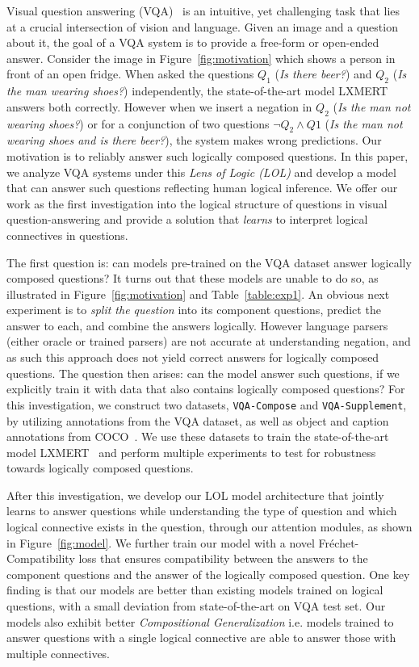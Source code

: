 Visual question answering (VQA)~\citep{antol2015vqa} is an intuitive, yet challenging task that lies at a crucial intersection of vision and language. 
Given an image and a question about it, the goal of a VQA system is to provide a free-form or open-ended answer.
Consider the image in Figure~\ref{fig:motivation} which shows a person in front of an open fridge.
When asked the questions $Q_1$ ({\it Is there beer?}) and $Q_2$ ({\it Is the man wearing shoes?}) independently, the state-of-the-art model LXMERT~\citep{tan2019lxmert} answers both correctly.
However when we insert a negation in $Q_2$ ({\it Is the man not wearing shoes?}) or for a conjunction of two questions $\neg Q_2 \wedge Q1$ ({\it Is the man not wearing shoes and is there beer?}), the system makes wrong predictions. 
Our motivation is to reliably answer such logically composed questions.
In this paper, we analyze VQA systems under this {\it Lens of Logic (LOL)} and develop a model that can answer such questions reflecting human logical inference.
We offer our work as the first investigation into the logical structure of questions in visual question-answering and provide a solution that {\it learns} to interpret logical connectives in questions.

The first question is: can models pre-trained on the VQA dataset answer logically composed questions?
It turns out that these models are unable to do so, as illustrated in Figure~\ref{fig:motivation} and Table~\ref{table:exp1}.
An obvious next experiment is to \textit{split the question} into its component questions, predict the answer to each, and combine the answers logically. 
However language parsers (either oracle or trained parsers) are not accurate at understanding negation, and as such this approach does not yield correct answers for logically composed questions.
The question then arises: can the model answer such questions, if we explicitly train it with data that also contains logically composed questions?
For this investigation, we construct two datasets, \texttt{VQA-Compose} and \texttt{VQA-Supplement}, by utilizing annotations from the VQA dataset, as well as object and caption annotations from COCO~\citep{lin2014microsoft}.
We use these datasets to train the state-of-the-art model LXMERT~\citep{tan2019lxmert} and perform multiple experiments to test for robustness towards logically composed questions.

After this investigation, we develop our LOL model architecture that jointly learns to answer questions while understanding the type of question and which logical connective exists in the question, through our attention modules, as shown in Figure~\ref{fig:model}.
We further train our model with a novel Fréchet-Compatibility loss that ensures compatibility between the answers to the component questions and the answer of the logically composed question.
One key finding is that our models are better than existing models trained on logical questions, with a small deviation from state-of-the-art on VQA test set.
Our models also exhibit better {\it Compositional Generalization} i.e. models trained to answer questions with a single logical connective are able to answer those with multiple connectives.

